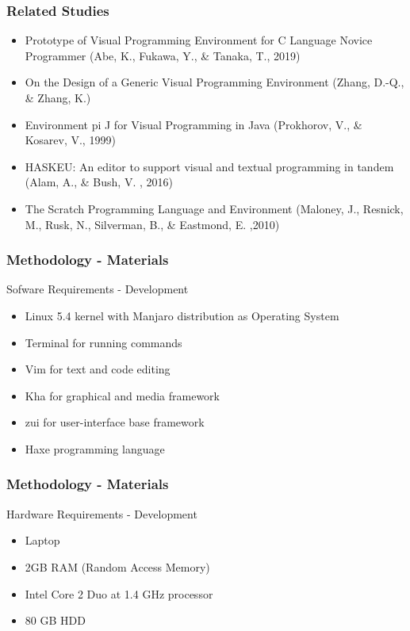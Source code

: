 \documentclass[handout]{beamer}
\begin{document}
\begin{frame}
	\frametitle{Related Studies}
	\begin{itemize}
		\item<1-> Prototype of Visual Programming Environment for C Language Novice Programmer (Abe, K., Fukawa, Y., \& Tanaka, T., 2019)
		\item<2-> On the Design of a Generic Visual Programming Environment (Zhang, D.-Q., \& Zhang, K.)
		\item<3-> Environment pi J for Visual Programming in Java (Prokhorov, V., \& Kosarev, V., 1999)
		\item<4-> HASKEU: An editor to support visual and textual programming in tandem (Alam, A., \& Bush, V. , 2016)
		\item<5-> The Scratch Programming Language and Environment (Maloney, J., Resnick, M., Rusk, N., Silverman, B., \& Eastmond, E. ,2010)
	\end{itemize}
\end{frame}

\begin{frame}
	\frametitle{Methodology - Materials}
	\begin{block}{Sofware Requirements - Development}
		\begin{itemize}
			\item<1-> Linux 5.4 kernel with Manjaro distribution as Operating System
			\item<2-> Terminal for running commands
			\item<3-> Vim for text and code editing
			\item<4-> Kha for graphical and media framework
			\item<5-> zui for user-interface base framework
			\item<6-> Haxe programming language
		\end{itemize}
	\end{block}
\end{frame}

\begin{frame}
	\frametitle{Methodology - Materials}
	\begin{block}{Hardware Requirements - Development}
		\begin{itemize}
			\item<1-> Laptop
			\item<2-> 2GB RAM (Random Access Memory)
			\item<3-> Intel Core 2 Duo at 1.4 GHz processor
			\item<4-> 80 GB HDD
		\end{itemize}
	\end{block}
\end{frame}
\end{document}
